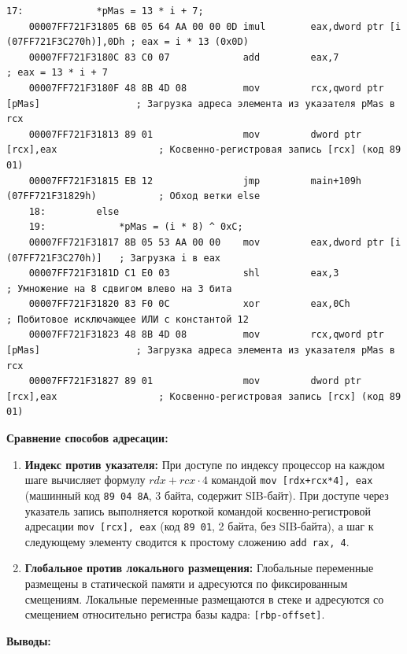 \documentclass[14pt, a4paper]{extarticle}
\begin{document}
\begin{lstlisting}[language={[x86masm]Assembler}, caption={Дизассемблерный код цикла при работе через указатель}]
	17: 			*pMas = 13 * i + 7;
	00007FF721F31805 6B 05 64 AA 00 00 0D imul        eax,dword ptr [i (07FF721F3C270h)],0Dh ; eax = i * 13 (0x0D)
	00007FF721F3180C 83 C0 07             add         eax,7                                ; eax = 13 * i + 7
	00007FF721F3180F 48 8B 4D 08          mov         rcx,qword ptr [pMas]                 ; Загрузка адреса элемента из указателя pMas в rcx
	00007FF721F31813 89 01                mov         dword ptr [rcx],eax                  ; Косвенно-регистровая запись [rcx] (код 89 01)
	00007FF721F31815 EB 12                jmp         main+109h (07FF721F31829h)           ; Обход ветки else
	18: 		else
	19: 			*pMas = (i * 8) ^ 0xC;
	00007FF721F31817 8B 05 53 AA 00 00    mov         eax,dword ptr [i (07FF721F3C270h)]   ; Загрузка i в eax
	00007FF721F3181D C1 E0 03             shl         eax,3                                ; Умножение на 8 сдвигом влево на 3 бита
	00007FF721F31820 83 F0 0C             xor         eax,0Ch                              ; Побитовое исключающее ИЛИ с константой 12
	00007FF721F31823 48 8B 4D 08          mov         rcx,qword ptr [pMas]                 ; Загрузка адреса элемента из указателя pMas в rcx
	00007FF721F31827 89 01                mov         dword ptr [rcx],eax                  ; Косвенно-регистровая запись [rcx] (код 89 01)\end{lstlisting}

	\noindent \textbf{Сравнение способов адресации:}
	\begin{enumerate}[noitemsep]
		\item \textbf{Индекс против указателя:} При доступе по индексу процессор на каждом шаге вычисляет формулу $rdx + rcx \cdot 4$ командой \texttt{mov [rdx+rcx*4], eax} (машинный код \texttt{89 04 8A}, 3 байта, содержит SIB-байт). При доступе через указатель запись выполняется короткой командой косвенно-регистровой адресации \texttt{mov [rcx], eax} (код \texttt{89 01}, 2 байта, без SIB-байта), а шаг к следующему элементу сводится к простому сложению \texttt{add rax, 4}.
		\item \textbf{Глобальное против локального размещения:} Глобальные переменные размещены в статической памяти и адресуются по фиксированным смещениям. Локальные переменные размещаются в стеке и адресуются со смещением относительно регистра базы кадра: \texttt{[rbp-offset]}.
	\end{enumerate}

	\noindent \textbf{Выводы:}
	
\end{document}
